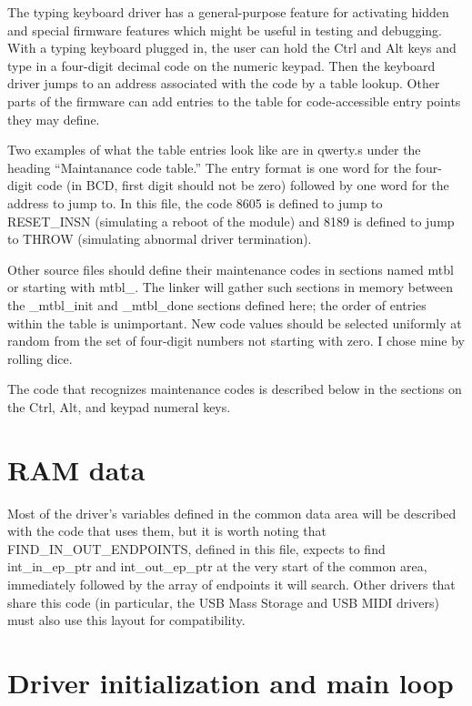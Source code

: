 The typing keyboard driver has a general-purpose feature for activating
hidden and special firmware features which might be useful in testing and
debugging.  With a typing keyboard plugged in, the user can hold the Ctrl
and Alt keys and type in a four-digit decimal code on the numeric keypad. 
Then the keyboard driver jumps to an address associated with the code by a
table lookup.  Other parts of the firmware can add entries to the table for
code-accessible entry points they may define.

Two examples of what the table entries look like are in qwerty.s under the
heading ``Maintanance code table.''  The entry format is one word for the
four-digit code (in BCD, first digit should not be zero) followed by one
word for the address to jump to.  In this file, the code 8605 is defined to
jump to RESET\_INSN (simulating a reboot of the module) and 8189 is defined
to jump to THROW (simulating abnormal driver termination).

Other source files should define their maintenance codes in sections named
mtbl or starting with mtbl\_.  The linker will gather such sections in
memory between the \_mtbl\_init and \_mtbl\_done sections defined here; the
order of entries within the table is unimportant.  New code values should be
selected uniformly at random from the set of four-digit numbers not starting
with zero.  I chose mine by rolling dice.

The code that recognizes maintenance codes is described below in the
sections on the Ctrl, Alt, and keypad numeral keys.

\section{RAM data}

Most of the driver's variables defined in the common data area will be
described with the code that uses them, but it is worth noting that
FIND\_IN\_OUT\_ENDPOINTS, defined in this file, expects to find
int\_in\_ep\_ptr and int\_out\_ep\_ptr at the very start of the common area,
immediately followed by the array of endpoints it will search.  Other
drivers that share this code (in particular, the USB Mass Storage and USB
MIDI drivers) must also use this layout for compatibility.

\section{Driver initialization and main loop}

